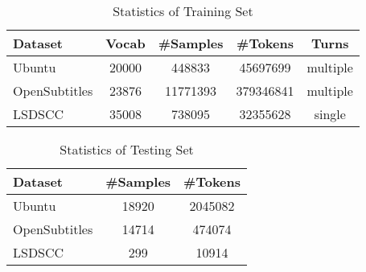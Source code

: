 \begin{table}[h]
    \centering
    \caption{Statistics of Training Set}
    \label{tab:StatisticsOfTrainingSet}
    \begin{tabular}{|l|*{4}{c|}}
        \hline
        Dataset & Vocab & \#Samples & \#Tokens & Turns \\
        \hline
        Ubuntu & 20000 & 448833 & 45697699 & multiple \\
        \hline
        OpenSubtitles & 23876 & 11771393 & 379346841 & multiple \\
        \hline
        LSDSCC & 35008 & 738095 & 32355628 & single \\
        \hline
    \end{tabular}
\end{table}

\begin{table}[h]
    \centering
    \caption{Statistics of Testing Set}
    \label{tab:StatisticsOfTestingSet}
    \begin{tabular}{|l|*{2}{c|}}
        \hline
        Dataset & \#Samples & \#Tokens \\
        \hline
        Ubuntu & 18920 & 2045082   \\
        \hline
        OpenSubtitles & 14714 & 474074 \\
        \hline
        LSDSCC & 299 & 10914 \\
        \hline
    \end{tabular}
\end{table}
